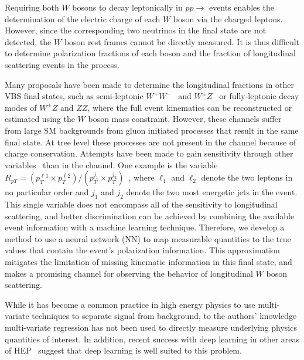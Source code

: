 Requiring both $W$ bosons to decay leptonically in  $pp
\to$ \ssWW events enables the determination of the electric charge of
each $W$ boson via the charged leptons. However, since the
corresponding two neutrinos in the final state are not detected, the
$W$ boson rest frames cannot be directly measured.  It is thus
difficult to determine polarization fractions of each boson and
the fraction of longitudinal scattering events in the \ssWW process.

Many proposals have been made to determine the longitudinal fractions in other VBS final states, such as semi-leptonic
$W^+W^-$~\cite{Han:2009em} and $W^\pm Z$~\cite{VBSCuts1} or
fully-leptonic decay modes of $W^\pm Z$ and $ZZ$, where the full
event kinematics can be reconstructed or estimated using the $W$ boson mass constraint. 
However, these channels suffer from large SM backgrounds from gluon initiated processes that result in the same final state. At tree level these processes are not present in the \ssWW channel because of charge conservation. Attempts have been made 
to gain sensitivity through other variables~\cite{VBSCuts1,VBSME,Doroba:2012pd} than \ts in the \ssWW
channel. One example is the variable $R_{pT}=(p_{T}^{\ell 1} \times
p_{T}^{\ell 2}) / (p_T^{j_1} \times p_T^{j_2})$~\cite{Doroba:2012pd},
where $\ell_1$ and $\ell_2$ denote the two leptons in no particular
order and $j_1$ and $j_2$ denote the two most energetic jets in the
event. This single variable does not encompass all of the
sensitivity to longitudinal scattering, and better discrimination can
be achieved by combining the available event information with a
machine learning technique. Therefore, we develop a method to use a
neural network (NN) to map measurable quantities to the true \cts values
that contain the event's polarization information. This
approximation mitigates the limitation of missing kinematic information
in this final state, and makes \ssWW a promising channel for observing
the behavior of longitudinal $W$ boson scattering.
 
While it has become a common practice in high energy physics to use
multi-variate techniques to separate signal from background, to the
authors' knowledge multi-variate regression has not been used to
directly measure underlying physics quantities of interest.
In addition, recent success with deep learning in other areas of
HEP~\cite{Baldi:2014kfa,Baldi:2014pta} suggest that deep learning
is well suited to this problem.

